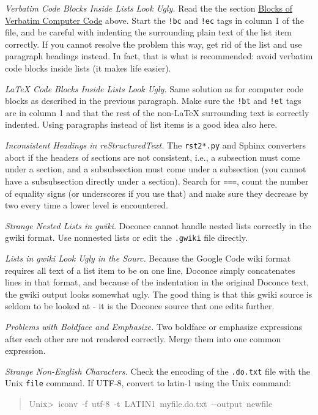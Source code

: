 \documentclass[a4paper,english]{article}
\begin{document}
\emph{Verbatim Code Blocks Inside Lists Look Ugly.} Read the the section \hyperref[blocks-of-verbatim-computer-code]{Blocks of Verbatim Computer Code} above.  Start the
\texttt{!bc} and \texttt{!ec} tags in column 1 of the file, and be careful with
indenting the surrounding plain text of the list item correctly. If
you cannot resolve the problem this way, get rid of the list and use
paragraph headings instead. In fact, that is what is recommended:
avoid verbatim code blocks inside lists (it makes life easier).

\emph{LaTeX Code Blocks Inside Lists Look Ugly.} Same solution as for computer code blocks as described in the
previous paragraph. Make sure the \texttt{!bt} and \texttt{!et} tags are in column 1
and that the rest of the non-LaTeX surrounding text is correctly indented.
Using paragraphs instead of list items is a good idea also here.

\emph{Inconsistent Headings in reStructuredText.} The \texttt{rst2*.py} and Sphinx converters abort if the headers of sections
are not consistent, i.e., a subsection must come under a section,
and a subsubsection must come under a subsection (you cannot have
a subsubsection directly under a section). Search for \texttt{===},
count the number of equality signs (or underscores if you use that)
and make sure they decrease by two every time a lower level is encountered.

\emph{Strange Nested Lists in gwiki.} Doconce cannot handle nested lists correctly in the gwiki format.
Use nonnested lists or edit the \texttt{.gwiki} file directly.

\emph{Lists in gwiki Look Ugly in the Sourc.} Because the Google Code wiki format requires all text of a list item to
be on one line, Doconce simply concatenates lines in that format,
and because of the indentation in the original Doconce text, the gwiki
output looks somewhat ugly. The good thing is that this gwiki source
is seldom to be looked at - it is the Doconce source that one edits
further.

\emph{Problems with Boldface and Emphasize.} Two boldface or emphasize expressions after each other are not rendered
correctly. Merge them into one common expression.

\emph{Strange Non-English Characters.} Check the encoding of the \texttt{.do.txt} file with the Unix \texttt{file} command.
If UTF-8, convert to latin-1 using the Unix command:
%
\begin{quote}{\ttfamily \raggedright \noindent
Unix>~iconv~-f~utf-8~-t~LATIN1~myfile.do.txt~-{}-output~newfile
}
\end{quote}
\end{document}
